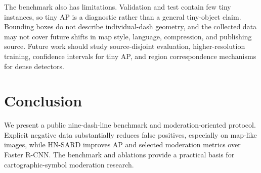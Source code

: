 \documentclass[conference,a4paper]{IEEEtran}
\begin{document}
The benchmark also has limitations. Validation and test contain
few tiny instances, so tiny AP is a diagnostic rather than a
general tiny-object claim. Bounding boxes do not describe
individual-dash geometry, and the collected data may not cover
future shifts in map style, language, compression, and publishing
source. Future work should study source-disjoint evaluation,
higher-resolution training, confidence intervals for tiny AP, and
region correspondence mechanisms for dense detectors.

\section{Conclusion}
We present a public nine-dash-line benchmark and moderation-oriented protocol. Explicit negative data substantially reduces false positives, especially on map-like images, while HN-SARD improves AP and selected moderation metrics over Faster R-CNN. The benchmark and ablations provide a practical basis for cartographic-symbol moderation research.
\end{document}

